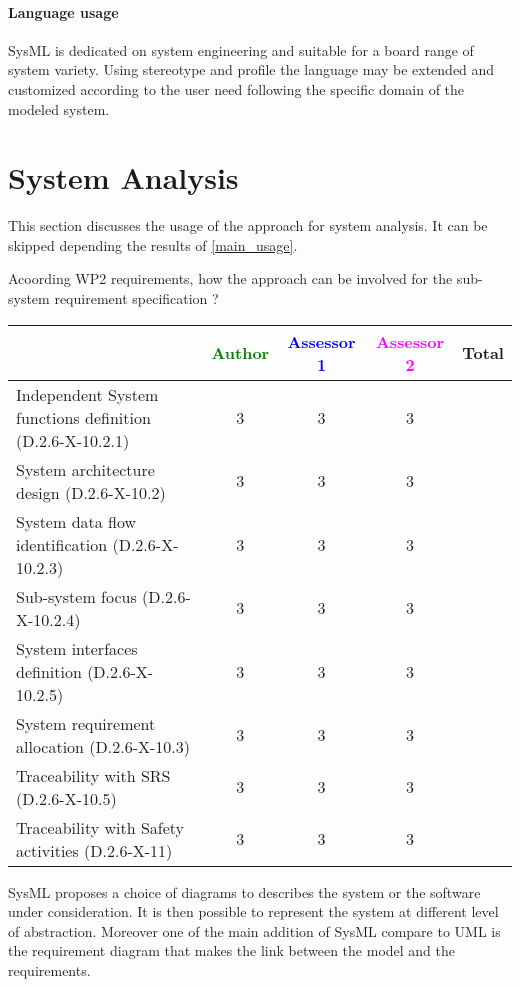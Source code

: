 \paragraph{Language usage} 
SysML is dedicated on system engineering and suitable for a board range of
system variety. Using stereotype and profile the language may be
extended and customized according to the user need following the
specific domain of the modeled system.


\section{System Analysis}
This section discusses the usage of the approach for system analysis.
It can be skipped depending the results of \ref{main_usage}.

Acoording WP2 requirements, how the approach can be involved for the sub-system requirement specification ?

\begin{tabular}{|l | c | c | c | c|}
\hline
& \textcolor{green}{Author} & \textcolor{blue}{Assessor 1} & \textcolor{magenta}{Assessor 2} & Total \\
\hline
Independent System functions definition (D.2.6-X-10.2.1)  &3 & 3& 3 &  \\
\hline 
System architecture design (D.2.6-X-10.2) &3 & 3& 3&  \\
\hline
System data flow identification (D.2.6-X-10.2.3)  &3 & 3& 3&  \\
\hline
Sub-system focus (D.2.6-X-10.2.4)  &3 & 3& 3&  \\
\hline
System interfaces definition (D.2.6-X-10.2.5)  &3 & 3& 3&  \\
\hline
System requirement allocation (D.2.6-X-10.3)  &3 & 3& 3&  \\
\hline
Traceability with SRS (D.2.6-X-10.5)  &3 & 3& 3&  \\
\hline
Traceability with Safety activities (D.2.6-X-11)  &3 & 3& 3&  \\
\hline
\end{tabular}
\begin{author_comment}
  SysML proposes a choice of diagrams to describes the system or the
  software under consideration. It is then possible to represent the
  system at different level of abstraction. Moreover one of the main
  addition of SysML compare to UML is the requirement diagram that
  makes the link between the model and the requirements.
\end{author_comment}


